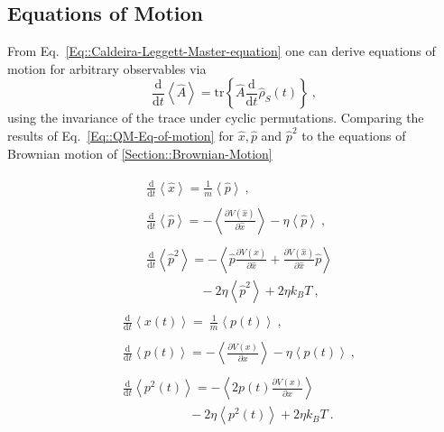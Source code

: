 	\subsection{Equations of Motion}
	From Eq.~\eqref{Eq::Caldeira-Leggett-Master-equation} one can derive equations of motion for arbitrary observables via
	\begin{equation}\label{Eq::QM-Eq-of-motion}
		\frac{\text{d}}{\text{d}t} \left \langle \hat{A} \right \rangle =	\text{tr} \left\{\hat{A} \frac{\text{d}}{\text{d}t } \hat{\rho}_S(t)\right\}~,
	\end{equation}
	using the invariance of the trace under cyclic permutations. Comparing the results of Eq.~\eqref{Eq::QM-Eq-of-motion} for $\hat{x}, \hat{p}$ and $\hat{p}^2$ to the equations of Brownian motion of \autoref{Section::Brownian-Motion}
	\begin{multicols}{2}
		\noindent
		\begin{align*}
			\begin{split}
				&\frac{\text{d}}{\text{d}t} \left \langle \hat{x} \right \rangle =	\frac{1}{m} \left\langle \hat{p} \right \rangle~,
			\end{split}
			\\
			\begin{split}
				&\frac{\text{d}}{\text{d}t} \left \langle \hat{p} \right \rangle = - 	\left\langle  \frac{\partial V(\hat{x})}{\partial \hat{x}} \right \rangle - \eta \left \langle \hat{p} \right \rangle ~,
			\end{split}
			\\
			\begin{split}
				&\frac{\text{d}}{\text{d}t} \left \langle \hat{p}^2 \right \rangle =	- \left\langle \hat{p} \frac{\partial V(\hat{x})}{\partial \hat{x}} + \frac{\partial V(\hat{x})}{\partial \hat{x}} \hat{p} \right \rangle \\
				&\qquad \qquad ~- 2 \eta \left \langle \hat{p}^2 \right \rangle + 2 \eta k_B T ~,
			\end{split}
		\end{align*}
		\begin{align*}
			\begin{split}
				&\frac{\text{d}}{\text{d}t} \left \langle {x}(t) \right \rangle  =	~\frac{1}{m} \left \langle {p}(t) \right \rangle ~,
			\end{split}
			\\
			\begin{split}
				&\frac{\text{d}}{\text{d}t} \left \langle {p}(t) \right \rangle =	- 	\left \langle \frac{\partial V({x})}{\partial {x}} \right \rangle - \eta \left \langle {p}(t) \right \rangle ~,
			\end{split}
			\\
			\begin{split}
				&\frac{\text{d}}{\text{d}t} \left \langle {p}^2(t) \right \rangle = - \left\langle 2 {p}(t) \frac{\partial V({x})}{\partial {x}}\right \rangle \\
				&\qquad \qquad \quad ~ - 2 \eta \left \langle {p}^2(t) \right \rangle + 2 \eta k_B T~.
			\end{split}
		\end{align*}
	\end{multicols}
